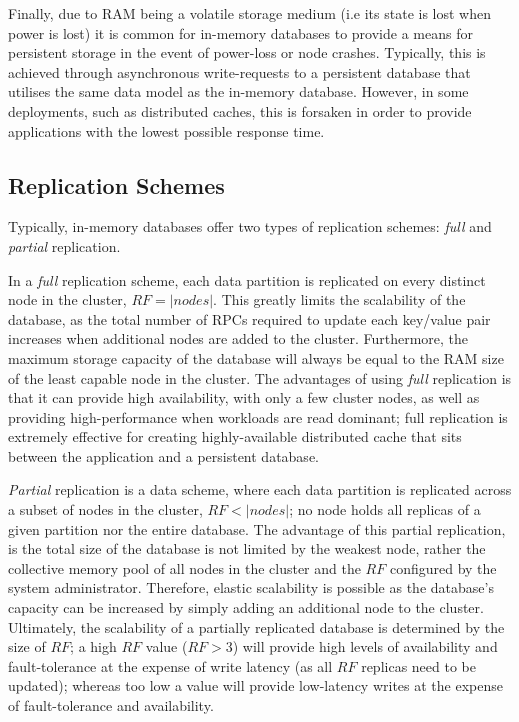 Finally, due to RAM being a volatile storage medium (i.e its state is lost when power is lost) it is common for in-memory databases to provide a means for persistent storage in the event of power-loss or node crashes.  Typically, this is achieved through asynchronous write-requests to a persistent database that utilises the same data model as the in-memory database.  However, in some deployments, such as distributed caches, this is forsaken in order to provide applications with the lowest possible response time.  
    
    \subsection{Replication Schemes}
	Typically, in-memory databases offer two types of replication schemes: \emph{full} and \emph{partial} replication.  
	
	In a \emph{full} replication scheme, each data partition is replicated on every distinct node in the cluster, $RF = \left\vert nodes \right\vert$.  This greatly limits the scalability of the database, as the total number of RPCs required to update each key/value pair increases when additional nodes are added to the cluster.  Furthermore, the maximum storage capacity of the database will always be equal to the RAM size of the least capable node in the cluster.  The advantages of using \emph{full} replication is that it can provide high availability, with only a few cluster nodes, as well as providing high-performance when workloads are read dominant; full replication is extremely effective for creating highly-available distributed cache that sits between the application and a persistent database.  
	
	\emph{Partial} replication is a data scheme, where each data partition is replicated across a subset of nodes in the cluster, $RF < \left\vert nodes \right\vert$; no node holds all replicas of a given partition nor the entire database.  The advantage of this partial replication, is the total size of the database is not limited by the weakest node, rather the collective memory pool of all nodes in the cluster and the $RF$ configured by the system administrator.  Therefore, elastic scalability is possible as the database's capacity can be increased by simply adding an additional node to the cluster.  Ultimately, the scalability of a partially replicated database is determined by the size of $RF$; a high $RF$ value ($RF > 3$) will provide high levels of availability and fault-tolerance at the expense of write latency (as all $RF$ replicas need to be updated); whereas too low a value will provide low-latency writes at the expense of fault-tolerance and availability.   
	
